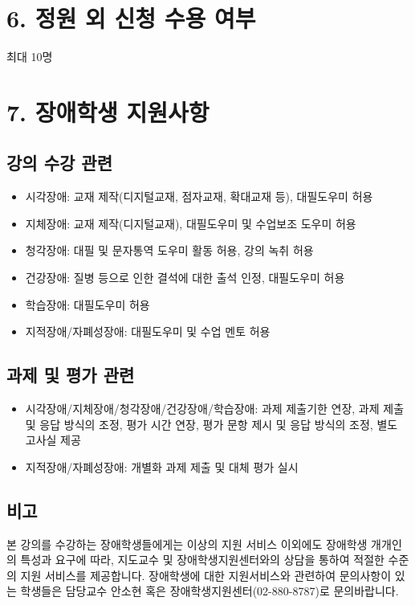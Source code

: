 \documentclass{article}
\begin{document}
\bigskip
\section{6. 정원 외 신청 수용 여부}
\medskip
최대 10명

\bigskip
\section{7. 장애학생 지원사항}
\medskip
\subsection{강의 수강 관련}
\medskip
\begin{itemize}
    \item 시각장애: 교재 제작(디지털교재, 점자교재, 확대교재 등), 대필도우미 허용
    \item 지체장애: 교재 제작(디지털교재), 대필도우미 및 수업보조 도우미 허용
    \item 청각장애: 대필 및 문자통역 도우미 활동 허용, 강의 녹취 허용
    \item 건강장애: 질병 등으로 인한 결석에 대한 출석 인정, 대필도우미 허용
    \item 학습장애: 대필도우미 허용
    \item 지적장애/자폐성장애: 대필도우미 및 수업 멘토 허용
\end{itemize}
\subsection{과제 및 평가 관련}
\medskip
\begin{itemize}
    \item 시각장애/지체장애/청각장애/건강장애/학습장애: 과제 제출기한 연장, 과제 제출 및 응답 방식의 조정, 평가 시간 연장, 평가 문항 제시 및 응답 방식의 조정, 별도 고사실 제공
    \item 지적장애/자폐성장애: 개별화 과제 제출 및 대체 평가 실시
\end{itemize}
\subsection{비고}
\medskip
본 강의를 수강하는 장애학생들에게는 이상의 지원 서비스 이외에도 장애학생 개개인의 특성과 요구에 따라, 지도교수 및 장애학생지원센터와의 상담을 통하여 적절한 수준의 지원 서비스를 제공합니다. 장애학생에 대한 지원서비스와 관련하여 문의사항이 있는 학생들은 담당교수 안소현 혹은 장애학생지원센터(02-880-8787)로 문의바랍니다.
\end{document}
